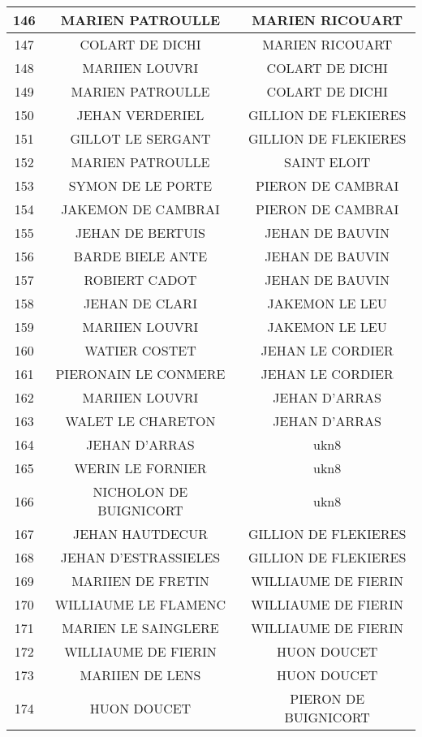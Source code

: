 \begin{center}
\begin{longtable}{|c|c|c|}
\hline	146	&	MARIEN PATROULLE	&	MARIEN RICOUART	\\
\hline	147	&	COLART DE DICHI	&	MARIEN RICOUART	\\
\hline	148	&	MARIIEN LOUVRI	&	COLART DE DICHI	\\
\hline	149	&	MARIEN PATROULLE	&	COLART DE DICHI	\\
\hline	150	&	JEHAN VERDERIEL	&	GILLION DE FLEKIERES	\\
\hline	151	&	GILLOT LE SERGANT	&	GILLION DE FLEKIERES	\\
\hline	152	&	MARIEN PATROULLE	&	SAINT ELOIT	\\
\hline	153	&	SYMON DE LE PORTE	&	PIERON DE CAMBRAI	\\
\hline	154	&	JAKEMON DE CAMBRAI	&	PIERON DE CAMBRAI	\\
\hline	155	&	JEHAN DE BERTUIS	&	JEHAN DE BAUVIN	\\
\hline	156	&	BARDE BIELE ANTE	&	JEHAN DE BAUVIN	\\
\hline	157	&	ROBIERT CADOT	&	JEHAN DE BAUVIN	\\
\hline	158	&	JEHAN DE CLARI	&	JAKEMON LE LEU	\\
\hline	159	&	MARIIEN LOUVRI	&	JAKEMON LE LEU	\\
\hline	160	&	WATIER COSTET	&	JEHAN LE CORDIER	\\
\hline	161	&	PIERONAIN LE CONMERE	&	JEHAN LE CORDIER	\\
\hline	162	&	MARIIEN LOUVRI	&	JEHAN D'ARRAS	\\
\hline	163	&	WALET LE CHARETON	&	JEHAN D'ARRAS	\\
\hline	164	&	JEHAN D'ARRAS	&	ukn8	\\
\hline	165	&	WERIN LE FORNIER	&	ukn8	\\
\hline	166	&	NICHOLON DE BUIGNICORT	&	ukn8	\\
\hline	167	&	JEHAN HAUTDECUR	&	GILLION DE FLEKIERES	\\
\hline	168	&	JEHAN D'ESTRASSIELES	&	GILLION DE FLEKIERES	\\
\hline	169	&	MARIIEN DE FRETIN	&	WILLIAUME DE FIERIN	\\
\hline	170	&	WILLIAUME LE FLAMENC	&	WILLIAUME DE FIERIN	\\
\hline	171	&	MARIEN LE SAINGLERE	&	WILLIAUME DE FIERIN	\\
\hline	172	&	WILLIAUME DE FIERIN	&	HUON DOUCET	\\
\hline	173	&	MARIIEN DE LENS	&	HUON DOUCET	\\
\hline	174	&	HUON DOUCET	&	PIERON DE BUIGNICORT	\\

\end{longtable}
\end{center}
